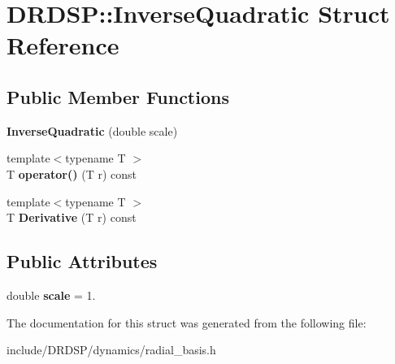 \hypertarget{struct_d_r_d_s_p_1_1_inverse_quadratic}{\section{D\-R\-D\-S\-P\-:\-:Inverse\-Quadratic Struct Reference}
\label{struct_d_r_d_s_p_1_1_inverse_quadratic}
}
\subsection*{Public Member Functions}
\begin{DoxyCompactItemize}
\item 
\hypertarget{struct_d_r_d_s_p_1_1_inverse_quadratic_a4a7714fcbafbaec4bb30c6922feb59e1}{{\bfseries Inverse\-Quadratic} (double scale)}\label{struct_d_r_d_s_p_1_1_inverse_quadratic_a4a7714fcbafbaec4bb30c6922feb59e1}

\item 
\hypertarget{struct_d_r_d_s_p_1_1_inverse_quadratic_a24a735561bee7c360ee1d1d86126fdad}{{\footnotesize template$<$typename T $>$ }\\T {\bfseries operator()} (T r) const }\label{struct_d_r_d_s_p_1_1_inverse_quadratic_a24a735561bee7c360ee1d1d86126fdad}

\item 
\hypertarget{struct_d_r_d_s_p_1_1_inverse_quadratic_af57547e80e67331d04526fbb98d9bc2c}{{\footnotesize template$<$typename T $>$ }\\T {\bfseries Derivative} (T r) const }\label{struct_d_r_d_s_p_1_1_inverse_quadratic_af57547e80e67331d04526fbb98d9bc2c}

\end{DoxyCompactItemize}
\subsection*{Public Attributes}
\begin{DoxyCompactItemize}
\item 
\hypertarget{struct_d_r_d_s_p_1_1_inverse_quadratic_a31241ecd1ec571b651307d29e6b69c07}{double {\bfseries scale} = 1.}\label{struct_d_r_d_s_p_1_1_inverse_quadratic_a31241ecd1ec571b651307d29e6b69c07}

\end{DoxyCompactItemize}


The documentation for this struct was generated from the following file\-:\begin{DoxyCompactItemize}
\item 
include/\-D\-R\-D\-S\-P/dynamics/radial\-\_\-basis.\-h\end{DoxyCompactItemize}
